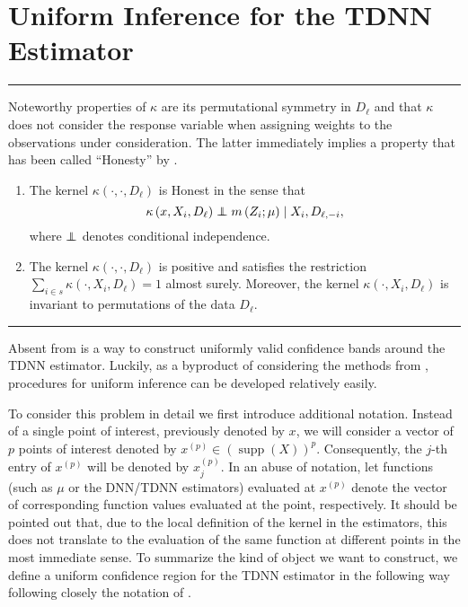 \section{Uniform Inference for the TDNN Estimator}\label{sec:unif_inf}
\hrule

Noteworthy properties of $\kappa$ are its permutational symmetry in $D_{\ell}$ and that $\kappa$ does not consider the response variable when assigning weights to the observations under consideration.
The latter immediately implies a property that has been called ``Honesty'' by \citet{wager_estimation_2018}.

\begin{boxD}
	\begin{dfn}\label{Symmetry_Honesty}\mbox{}
		\begin{enumerate}
			\item The kernel $\kappa\left(\cdot, \cdot, D_{\ell}\right)$ is Honest in the sense that
				  $$\kappa\left(x, X_{i}, D_{\ell}\right) \perp\!\!\!\!\perp m\left(Z_{i} ; \mu\right) \mid X_{i}, D_{\ell,-i},$$
				  where $\perp\!\!\!\!\perp$ denotes conditional independence.
			\item The kernel $\kappa\left(\cdot, \cdot, D_{\ell}\right)$ is positive and satisfies the restriction
				  $\sum_{i \in s} \kappa\left(\cdot, X_{i}, D_{\ell}\right)=1$ almost surely.
				  Moreover, the kernel $\kappa\left(\cdot, X_{i}, D_{\ell}\right)$ is invariant to permutations of the data $D_{\ell}.$
		\end{enumerate}
	\end{dfn}
\end{boxD}

\hrule
Absent from \citet{demirkaya_optimal_2024} is a way to construct uniformly valid confidence bands around the TDNN estimator.
Luckily, as a byproduct of considering the methods from \citet{ritzwoller_simultaneous_2024}, procedures for uniform inference can be developed relatively easily.

To consider this problem in detail we first introduce additional notation.
Instead of a single point of interest, previously denoted by $x$, we will consider a vector of $p$ points of interest denoted by $x^{(p)} \in \left(\operatorname{supp}\left(X\right)\right)^{p}$.
Consequently, the $j$-th entry of $x^{(p)}$ will be denoted by $x^{(p)}_{j}$.
In an abuse of notation, let functions (such as $\mu$ or the DNN/TDNN estimators) evaluated at $x^{(p)}$ denote the vector of corresponding function values evaluated at the point, respectively.
It should be pointed out that, due to the local definition of the kernel in the estimators, this does not translate to the evaluation of the same function at different points in the most immediate sense.
To summarize the kind of object we want to construct, we define a uniform confidence region for the TDNN estimator in the following way following closely the notation of \citet{ritzwoller_simultaneous_2024}.

